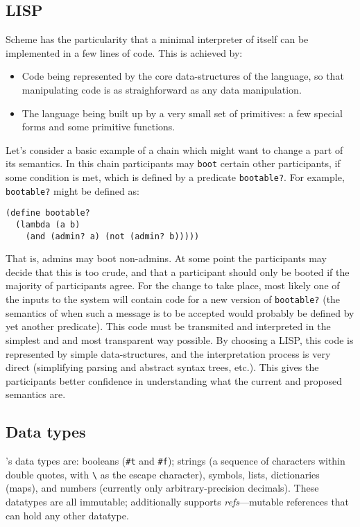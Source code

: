\subsection{LISP}

Scheme has the particularity that a minimal interpreter of itself can
be implemented in a few lines of code. This is achieved by:
\begin{itemize}
  \item Code being represented by the core data-structures of the language, so
      that manipulating code is as straighforward as any data manipulation.
  \item The language being built up by a very small set of primitives: a few
    special forms and some primitive functions.
\end{itemize}
Let's consider a basic example of a chain which might want to change a part of
its semantics. In this chain participants may \texttt{boot} certain other
participants, if some condition is met, which is defined by a predicate
\texttt{bootable?}. For example, \texttt{bootable?} might be defined as:
\begin{lstlisting}
(define bootable?
  (lambda (a b)
    (and (admin? a) (not (admin? b)))))
\end{lstlisting}
That is, admins may boot non-admins. At some point the participants may decide
that this is too crude, and that a participant should only be booted if the
majority of participants agree. For the change to take place, most likely one of
the inputs to the system will contain code for a new version of
\texttt{bootable?} (the semantics of when such a message is to be accepted would
probably be defined by yet another predicate). This code must be transmited and
interpreted in the simplest and and most transparent way possible. By choosing a LISP,
this code is represented by simple data-structures, and the interpretation process is
very direct (simplifying parsing and abstract syntax trees, etc.). This
gives the participants better confidence in understanding what the current and
proposed semantics are.

\subsection{Data types}
\rad{}'s data types are: booleans (\texttt{\#t} and
\texttt{\#f}); strings (a sequence of characters within double quotes, with
\verb$\$ as the escape character), symbols, lists, dictionaries
(maps), and numbers (currently only arbitrary-precision decimals). These
datatypes are all immutable; additionally \rad{} supports \emph{refs}---mutable
references that can hold any other datatype.

